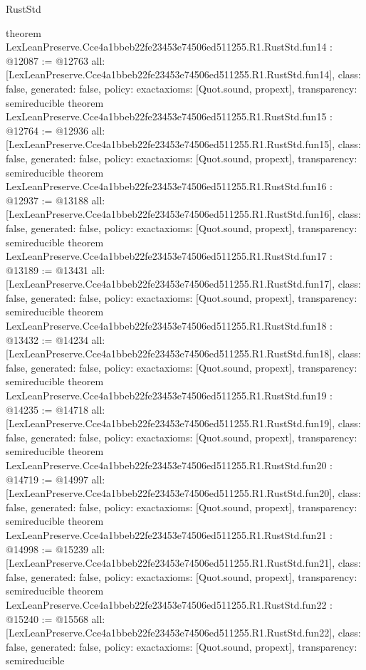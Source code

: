 \begin{lexlean}{RustStd}
\begin{coremodule}
{}
theorem LexLeanPreserve.Cce4a1bbeb22fe23453e74506ed511255.R1.RustStd.fun14 : @12087 := @12763 {
  all: [LexLeanPreserve.Cce4a1bbeb22fe23453e74506ed511255.R1.RustStd.fun14],
  class: false,
  generated: false,
  policy: exact{axioms: [Quot.sound, propext]},
  transparency: semireducible
}
theorem LexLeanPreserve.Cce4a1bbeb22fe23453e74506ed511255.R1.RustStd.fun15 : @12764 := @12936 {
  all: [LexLeanPreserve.Cce4a1bbeb22fe23453e74506ed511255.R1.RustStd.fun15],
  class: false,
  generated: false,
  policy: exact{axioms: [Quot.sound, propext]},
  transparency: semireducible
}
theorem LexLeanPreserve.Cce4a1bbeb22fe23453e74506ed511255.R1.RustStd.fun16 : @12937 := @13188 {
  all: [LexLeanPreserve.Cce4a1bbeb22fe23453e74506ed511255.R1.RustStd.fun16],
  class: false,
  generated: false,
  policy: exact{axioms: [Quot.sound, propext]},
  transparency: semireducible
}
theorem LexLeanPreserve.Cce4a1bbeb22fe23453e74506ed511255.R1.RustStd.fun17 : @13189 := @13431 {
  all: [LexLeanPreserve.Cce4a1bbeb22fe23453e74506ed511255.R1.RustStd.fun17],
  class: false,
  generated: false,
  policy: exact{axioms: [Quot.sound, propext]},
  transparency: semireducible
}
theorem LexLeanPreserve.Cce4a1bbeb22fe23453e74506ed511255.R1.RustStd.fun18 : @13432 := @14234 {
  all: [LexLeanPreserve.Cce4a1bbeb22fe23453e74506ed511255.R1.RustStd.fun18],
  class: false,
  generated: false,
  policy: exact{axioms: [Quot.sound, propext]},
  transparency: semireducible
}
theorem LexLeanPreserve.Cce4a1bbeb22fe23453e74506ed511255.R1.RustStd.fun19 : @14235 := @14718 {
  all: [LexLeanPreserve.Cce4a1bbeb22fe23453e74506ed511255.R1.RustStd.fun19],
  class: false,
  generated: false,
  policy: exact{axioms: [Quot.sound, propext]},
  transparency: semireducible
}
theorem LexLeanPreserve.Cce4a1bbeb22fe23453e74506ed511255.R1.RustStd.fun20 : @14719 := @14997 {
  all: [LexLeanPreserve.Cce4a1bbeb22fe23453e74506ed511255.R1.RustStd.fun20],
  class: false,
  generated: false,
  policy: exact{axioms: [Quot.sound, propext]},
  transparency: semireducible
}
theorem LexLeanPreserve.Cce4a1bbeb22fe23453e74506ed511255.R1.RustStd.fun21 : @14998 := @15239 {
  all: [LexLeanPreserve.Cce4a1bbeb22fe23453e74506ed511255.R1.RustStd.fun21],
  class: false,
  generated: false,
  policy: exact{axioms: [Quot.sound, propext]},
  transparency: semireducible
}
theorem LexLeanPreserve.Cce4a1bbeb22fe23453e74506ed511255.R1.RustStd.fun22 : @15240 := @15568 {
  all: [LexLeanPreserve.Cce4a1bbeb22fe23453e74506ed511255.R1.RustStd.fun22],
  class: false,
  generated: false,
  policy: exact{axioms: [Quot.sound, propext]},
  transparency: semireducible
}
\end{coremodule}
\end{lexlean}
